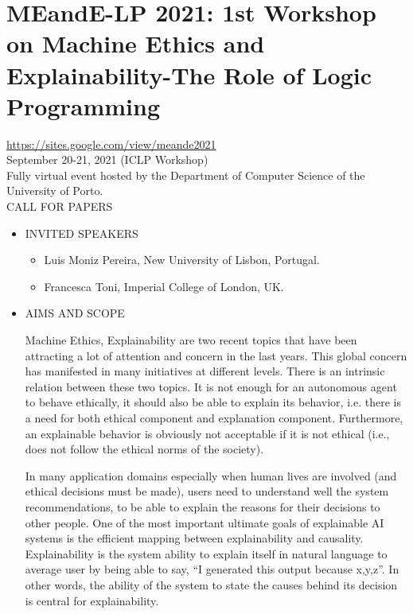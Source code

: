 \documentclass[prodmode,acmtecs]{acmsmall} %
\begin{document}
\section{MEandE-LP 2021: 1st Workshop on Machine Ethics and Explainability-The Role of Logic Programming }\label{MEandELP2021}  \href{https://sites.google.com/view/meande2021}{https://sites.google.com/view/meande2021}\\ 
  September 20-21, 2021 (ICLP Workshop) \\ 
  Fully virtual event hosted by the Department of Computer Science of the University of Porto. \\ 
CALL FOR PAPERS 

\begin{itemize}\item  INVITED SPEAKERS 
 
\begin{itemize}\item  Luis Moniz Pereira, New University of Lisbon, Portugal.
\item  Francesca Toni, Imperial College of London, UK.                      
\end{itemize} 
\item  AIMS AND SCOPE 
 
  Machine Ethics, Explainability are two recent topics that have been attracting a lot of attention and concern in the last years. This global concern has manifested in many initiatives at different levels. There is an intrinsic relation between these two topics. It is not enough for an autonomous agent to behave ethically, it should also be able to explain its behavior, i.e. there is a need for both ethical component and explanation component. Furthermore, an explainable behavior is obviously not acceptable if it is not ethical (i.e., does not follow the ethical norms of the society). 
 
  In many application domains especially when human lives are involved (and ethical decisions must be made), users need to understand well the system recommendations, to be able to explain the reasons for their decisions to other people. One of the most important ultimate goals of explainable AI systems is the efficient mapping between explainability and causality. Explainability is the system ability to explain itself in natural language to average user by being able to say, ``I generated this output because x,y,z''. In other words, the ability of the system to state the causes behind its decision is central for explainability.  
 

\end{itemize}
\end{document}
